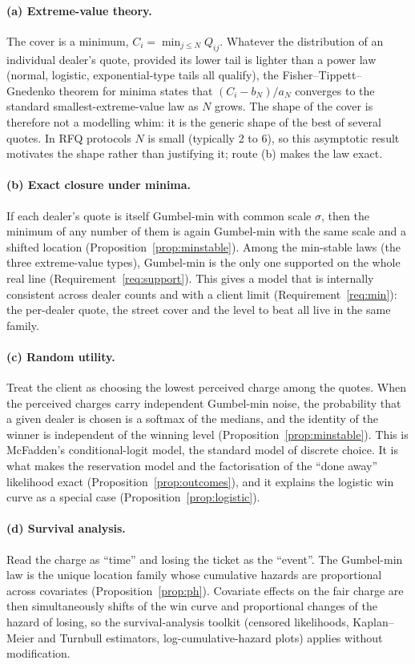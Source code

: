 \documentclass[11pt,a4paper]{article}
\theoremstyle{definition}
\theoremstyle{remark}
\begin{document}
\paragraph{(a) Extreme-value theory.} The cover is a minimum, $C_i=\min_{j\le N}Q_{ij}$. Whatever the distribution of an individual dealer's quote, provided its lower tail is lighter than a power law (normal, logistic, exponential-type tails all qualify), the Fisher--Tippett--Gnedenko theorem for minima states that $(C_i-b_N)/a_N$ converges to the standard smallest-extreme-value law as $N$ grows. The shape of the cover is therefore not a modelling whim: it is the generic shape of the best of several quotes. In RFQ protocols $N$ is small (typically 2 to 6), so this asymptotic result motivates the shape rather than justifying it; route (b) makes the law exact.

\paragraph{(b) Exact closure under minima.} If each dealer's quote is itself Gumbel-min with common scale $\sigma$, then the minimum of any number of them is again Gumbel-min with the same scale and a shifted location (Proposition~\ref{prop:minstable}). Among the min-stable laws (the three extreme-value types), Gumbel-min is the only one supported on the whole real line (Requirement~\ref{req:support}). This gives a model that is internally consistent across dealer counts and with a client limit (Requirement~\ref{req:min}): the per-dealer quote, the street cover and the level to beat all live in the same family.

\paragraph{(c) Random utility.} Treat the client as choosing the lowest perceived charge among the quotes. When the perceived charges carry independent Gumbel-min noise, the probability that a given dealer is chosen is a softmax of the medians, and the identity of the winner is independent of the winning level (Proposition~\ref{prop:minstable}). This is McFadden's conditional-logit model, the standard model of discrete choice. It is what makes the reservation model and the factorisation of the ``done away'' likelihood exact (Proposition~\ref{prop:outcomes}), and it explains the logistic win curve as a special case (Proposition~\ref{prop:logistic}).

\paragraph{(d) Survival analysis.} Read the charge as ``time'' and losing the ticket as the ``event''. The Gumbel-min law is the unique location family whose cumulative hazards are proportional across covariates (Proposition~\ref{prop:ph}). Covariate effects on the fair charge are then simultaneously shifts of the win curve and proportional changes of the hazard of losing, so the survival-analysis toolkit (censored likelihoods, Kaplan--Meier and Turnbull estimators, log-cumulative-hazard plots) applies without modification.
\end{document}
